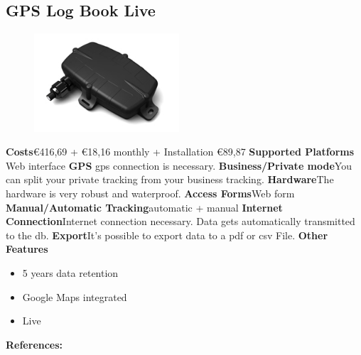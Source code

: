 \begin{singlespace}
\section{GPS Log Book Live}
\begin{figure}
  \begin{center}
    \includegraphics[width=0.48\textwidth]{bilder/GPSlogbooklive!}
  \end{center}
\end{figure}
\textbf{Costs}\euro 416,69 + \euro 18,16 monthly + Installation \euro 89,87 
\newline\newline
\textbf{Supported Platforms} Web interface
\newline\newline
\textbf{GPS} \gls{gps} connection is necessary.
\newline\newline
\textbf{Business/Private mode}You can split your private tracking from your business tracking.
\newline\newline
\textbf{Hardware}The hardware is very robust and waterproof.
\newline\newline
\textbf{Access Forms}Web form
\newline\newline
\textbf{Manual/Automatic Tracking}automatic + manual
\newline\newline
\textbf{Internet Connection}Internet connection necessary.
Data gets automatically  transmitted to the \gls{db}.
\newline\newline
\textbf{Export}It’s possible to export data to a \gls{pdf} or \gls{csv} File.
\newline\newline
\textbf{Other Features}
\begin{itemize}
\item 5 years data retention  
\item Google Maps integrated
\item Live
\end{itemize}
\textbf{References:} \cite{GPS_Log_Book_LIVE}
\newpage


\end{singlespace}
